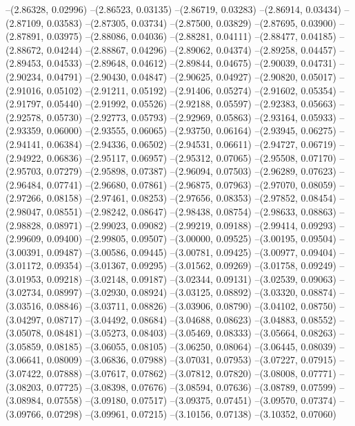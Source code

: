 --(2.86328, 0.02996)
--(2.86523, 0.03135)
--(2.86719, 0.03283)
--(2.86914, 0.03434)
--(2.87109, 0.03583)
--(2.87305, 0.03734)
--(2.87500, 0.03829)
--(2.87695, 0.03900)
--(2.87891, 0.03975)
--(2.88086, 0.04036)
--(2.88281, 0.04111)
--(2.88477, 0.04185)
--(2.88672, 0.04244)
--(2.88867, 0.04296)
--(2.89062, 0.04374)
--(2.89258, 0.04457)
--(2.89453, 0.04533)
--(2.89648, 0.04612)
--(2.89844, 0.04675)
--(2.90039, 0.04731)
--(2.90234, 0.04791)
--(2.90430, 0.04847)
--(2.90625, 0.04927)
--(2.90820, 0.05017)
--(2.91016, 0.05102)
--(2.91211, 0.05192)
--(2.91406, 0.05274)
--(2.91602, 0.05354)
--(2.91797, 0.05440)
--(2.91992, 0.05526)
--(2.92188, 0.05597)
--(2.92383, 0.05663)
--(2.92578, 0.05730)
--(2.92773, 0.05793)
--(2.92969, 0.05863)
--(2.93164, 0.05933)
--(2.93359, 0.06000)
--(2.93555, 0.06065)
--(2.93750, 0.06164)
--(2.93945, 0.06275)
--(2.94141, 0.06384)
--(2.94336, 0.06502)
--(2.94531, 0.06611)
--(2.94727, 0.06719)
--(2.94922, 0.06836)
--(2.95117, 0.06957)
--(2.95312, 0.07065)
--(2.95508, 0.07170)
--(2.95703, 0.07279)
--(2.95898, 0.07387)
--(2.96094, 0.07503)
--(2.96289, 0.07623)
--(2.96484, 0.07741)
--(2.96680, 0.07861)
--(2.96875, 0.07963)
--(2.97070, 0.08059)
--(2.97266, 0.08158)
--(2.97461, 0.08253)
--(2.97656, 0.08353)
--(2.97852, 0.08454)
--(2.98047, 0.08551)
--(2.98242, 0.08647)
--(2.98438, 0.08754)
--(2.98633, 0.08863)
--(2.98828, 0.08971)
--(2.99023, 0.09082)
--(2.99219, 0.09188)
--(2.99414, 0.09293)
--(2.99609, 0.09400)
--(2.99805, 0.09507)
--(3.00000, 0.09525)
--(3.00195, 0.09504)
--(3.00391, 0.09487)
--(3.00586, 0.09445)
--(3.00781, 0.09425)
--(3.00977, 0.09404)
--(3.01172, 0.09354)
--(3.01367, 0.09295)
--(3.01562, 0.09269)
--(3.01758, 0.09249)
--(3.01953, 0.09218)
--(3.02148, 0.09187)
--(3.02344, 0.09131)
--(3.02539, 0.09063)
--(3.02734, 0.08997)
--(3.02930, 0.08924)
--(3.03125, 0.08892)
--(3.03320, 0.08874)
--(3.03516, 0.08846)
--(3.03711, 0.08826)
--(3.03906, 0.08790)
--(3.04102, 0.08750)
--(3.04297, 0.08717)
--(3.04492, 0.08684)
--(3.04688, 0.08623)
--(3.04883, 0.08552)
--(3.05078, 0.08481)
--(3.05273, 0.08403)
--(3.05469, 0.08333)
--(3.05664, 0.08263)
--(3.05859, 0.08185)
--(3.06055, 0.08105)
--(3.06250, 0.08064)
--(3.06445, 0.08039)
--(3.06641, 0.08009)
--(3.06836, 0.07988)
--(3.07031, 0.07953)
--(3.07227, 0.07915)
--(3.07422, 0.07888)
--(3.07617, 0.07862)
--(3.07812, 0.07820)
--(3.08008, 0.07771)
--(3.08203, 0.07725)
--(3.08398, 0.07676)
--(3.08594, 0.07636)
--(3.08789, 0.07599)
--(3.08984, 0.07558)
--(3.09180, 0.07517)
--(3.09375, 0.07451)
--(3.09570, 0.07374)
--(3.09766, 0.07298)
--(3.09961, 0.07215)
--(3.10156, 0.07138)
--(3.10352, 0.07060)
